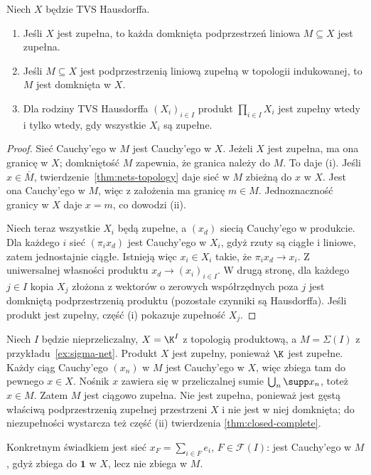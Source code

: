 \begin{twierdzenie}
\label{thm:closed-complete}
Niech $X$ będzie TVS Hausdorffa.
\begin{enumerate}[label=\textup{(\roman*)}]
\item Jeśli $X$ jest zupełna, to każda domknięta
      podprzestrzeń liniowa $M\subseteq X$ jest zupełna.
\item Jeśli $M\subseteq X$ jest podprzestrzenią liniową zupełną
      w topologii indukowanej, to $M$ jest domknięta w $X$.
\item Dla rodziny TVS Hausdorffa $(X_i)_{i\in I}$ produkt
      $\prod_{i\in I}X_i$ jest zupełny wtedy i tylko wtedy,
      gdy wszystkie $X_i$ są zupełne.
\end{enumerate}
\end{twierdzenie}
\begin{proof}
Sieć Cauchy'ego w $M$ jest Cauchy'ego w $X$.
Jeżeli $X$ jest zupełna, ma ona granicę w $X$; domkniętość
$M$ zapewnia, że granica należy do $M$. To daje (i).
Jeśli $x\in\overline M$, twierdzenie~\ref{thm:nets-topology}
daje sieć w $M$ zbieżną do $x$ w $X$. Jest ona Cauchy'ego
w $M$, więc z założenia ma granicę $m\in M$.
Jednoznaczność granicy w $X$ daje $x=m$, co dowodzi (ii).

Niech teraz wszystkie $X_i$ będą zupełne, a $(x_d)$
siecią Cauchy'ego w produkcie. Dla każdego $i$ sieć
$(\pi_i x_d)$ jest Cauchy'ego w $X_i$, gdyż rzuty
są ciągłe i liniowe, zatem jednostajnie ciągłe.
Istnieją więc $x_i\in X_i$ takie, że $\pi_i x_d\to x_i$.
Z uniwersalnej własności produktu $x_d\to(x_i)_{i\in I}$.
W drugą stronę, dla każdego $j\in I$ kopia $X_j$
złożona z wektorów o zerowych współrzędnych poza $j$
jest domkniętą podprzestrzenią produktu (pozostałe czynniki
są Hausdorffa). Jeśli produkt jest zupełny, część (i)
pokazuje zupełność $X_j$.
\end{proof}

\begin{przyklad}
\label{ex:seq-not-complete}
Niech $I$ będzie nieprzeliczalny, $X=\K^I$ z topologią
produktową, a $M=\Sigma(I)$ z przykładu~\ref{ex:sigma-net}.
Produkt $X$ jest zupełny, ponieważ $\K$ jest zupełne.
Każdy ciąg Cauchy'ego $(x_n)$ w $M$ jest Cauchy'ego w $X$,
więc zbiega tam do pewnego $x\in X$. Nośnik $x$ zawiera
się w przeliczalnej sumie $\bigcup_n\supp x_n$, toteż $x\in M$.
Zatem $M$ jest ciągowo zupełna. Nie jest zupełna,
ponieważ jest gęstą właściwą podprzestrzenią zupełnej
przestrzeni $X$ i nie jest w niej domknięta; do
niezupełności wystarcza też część (ii) twierdzenia
\ref{thm:closed-complete}.

Konkretnym świadkiem jest sieć $x_F=\sum_{i\in F}e_i$,
$F\in\mathcal F(I)$: jest Cauchy'ego w $M$, gdyż
zbiega do $\mathbf1$ w $X$, lecz nie zbiega w $M$.
\end{przyklad}

